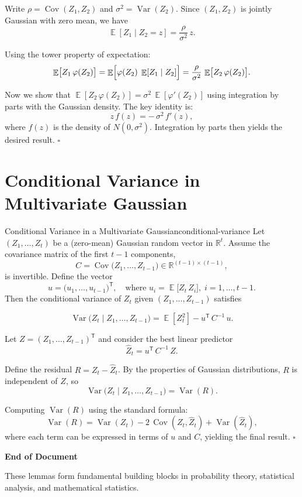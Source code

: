 \documentclass[11pt]{article}
\DeclareMathOperator{\Var}{Var}
\DeclareMathOperator{\Cov}{Cov}
\DeclareMathOperator{\Exp}{\mathbb{E}}
\newcommand{\R}{\mathbb{R}}
\renewenvironment{proof}[1][\proofname]{%
  \begin{tcolorbox}[
    enhanced,
    colback=proofcolor,
    colframe=proofframe,
    title={\textbf{#1}},
    fonttitle=\bfseries,
    coltitle=black,
    colbacktitle=proofcolor,
    boxrule=0.8pt,
    arc=2pt,
    breakable,
    left=8pt,
    right=8pt,
    top=6pt,
    bottom=6pt,
    before upper={\parindent15pt}
  ]
}{%
  \hfill$\square$
  \end{tcolorbox}
}
\begin{document}
\begin{proof}
Write $\rho = \Cov(Z_1,Z_2)$ and $\sigma^2 = \Var(Z_2)$. Since $(Z_1,Z_2)$ is jointly Gaussian with zero mean, we have
\[
\Exp[Z_1\mid Z_2=z] = \frac{\rho}{\sigma^2}\,z.
\]

Using the tower property of expectation:
\[
\Exp\bigl[Z_1\,\varphi(Z_2)\bigr] = \Exp\Bigl[\varphi(Z_2)\;\Exp[Z_1\mid Z_2]\Bigr] = \frac{\rho}{\sigma^2}\,\Exp\bigl[Z_2\,\varphi(Z_2)\bigr].
\]

Now we show that $\Exp[Z_2\,\varphi(Z_2)] = \sigma^2\,\Exp[\varphi'(Z_2)]$ using integration by parts with the Gaussian density. The key identity is:
\[
z\,f(z) = -\,\sigma^2\,f'(z),
\]
where $f(z)$ is the density of $N(0,\sigma^2)$. Integration by parts then yields the desired result.
\end{proof}

\section{Conditional Variance in Multivariate Gaussian}

\begin{lemma}{Conditional Variance in a Multivariate Gaussian}{conditional-variance}
Let $(Z_1,\dots,Z_t)$ be a (zero-mean) Gaussian random vector in $\R^t$. Assume the covariance matrix of the first $t-1$ components,
\[
C =\Cov\bigl(Z_1,\dots,Z_{t-1}\bigr) \in\R^{(t-1)\times(t-1)},
\]
is invertible. Define the vector
\[
u =\bigl(u_1,\dots,u_{t-1}\bigr)^{\mathsf{T}}, 
\quad
\text{where }u_i =\Exp\bigl[Z_t\,Z_i\bigr], 
\;i=1,\dots,t-1.
\]
Then the conditional variance of $Z_t$ given $(Z_1,\dots,Z_{t-1})$ satisfies
\begin{tcolorbox}[mathbox]
\[
\Var\bigl(Z_t \mid Z_1,\dots,Z_{t-1}\bigr)
=
\Exp[Z_t^2]
-u^{\mathsf{T}}\,C^{-1}\,u.
\]
\end{tcolorbox}
\end{lemma}

\begin{proof}
Let $Z = (Z_1,\dots,Z_{t-1})^{\mathsf{T}}$ and consider the best linear predictor
\[
\hat{Z}_t = u^{\mathsf{T}}\,C^{-1}\,Z.
\]

Define the residual $R = Z_t -\hat{Z}_t$. By the properties of Gaussian distributions, $R$ is independent of $Z$, so
\[
\Var\bigl(Z_t \mid Z_1,\dots,Z_{t-1}\bigr) = \Var(R).
\]

Computing $\Var(R)$ using the standard formula:
\[
\Var(R) = \Var(Z_t) - 2\,\Cov(Z_t,\hat{Z}_t) + \Var(\hat{Z}_t),
\]
where each term can be expressed in terms of $u$ and $C$, yielding the final result.
\end{proof}

\vspace{1cm}
\begin{center}
\begin{tcolorbox}[width=0.9\textwidth,colback=blue!5!white,colframe=blue!50!black,arc=5pt]
\centering
\textbf{\Large End of Document}
\vspace{0.3cm}

These lemmas form fundamental building blocks in probability theory, 
statistical analysis, and mathematical statistics.
\end{tcolorbox}
\end{center}
\end{document}
